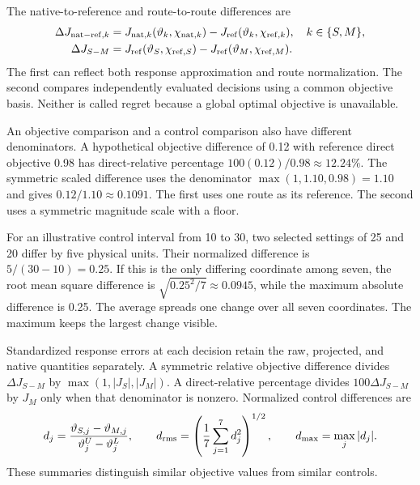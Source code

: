The native-to-reference and route-to-route differences are
\begin{align}
\equationname{Difference between route-native and reference-model objectives}
\Delta J_{{\rm nat-ref},k}&=
J_{{\rm nat},k}(\vartheta_k,\chi_{{\rm nat},k})
-J_{\rm ref}(\vartheta_k,\chi_{{\rm ref},k}),\quad k\in\{S,M\},\\
\equationname{Reference-model objective difference between optimization routes}
\Delta J_{S-M}&=J_{\rm ref}(\vartheta_S,\chi_{{\rm ref},S})
-J_{\rm ref}(\vartheta_M,\chi_{{\rm ref},M}).
\label{eq:plant_objective_comparison}
\end{align}
The first can reflect both response approximation and route normalization. The second compares independently evaluated decisions using a common objective basis. Neither is called regret because a global optimal objective is unavailable.

An objective comparison and a control comparison also have different denominators. A hypothetical objective difference of 0.12 with reference direct objective 0.98 has direct-relative percentage $100(0.12)/0.98\approx12.24\%$. The symmetric scaled difference uses the denominator $\max(1,1.10,0.98)=1.10$ and gives $0.12/1.10\approx0.1091$. The first uses one route as its reference. The second uses a symmetric magnitude scale with a floor.

For an illustrative control interval from 10 to 30, two selected settings of 25 and 20 differ by five physical units. Their normalized difference is $5/(30-10)=0.25$. If this is the only differing coordinate among seven, the root mean square difference is $\sqrt{0.25^2/7}\approx0.0945$, while the maximum absolute difference is 0.25. The average spreads one change over all seven coordinates. The maximum keeps the largest change visible.

Standardized response errors at each decision retain the raw, projected, and native quantities separately. A symmetric relative objective difference divides $\Delta J_{S-M}$ by $\max(1,|J_S|,|J_M|)$. A direct-relative percentage divides $100\Delta J_{S-M}$ by $J_M$ only when that denominator is nonzero. Normalized control differences are
\begin{equation}
\equationname{Normalized operating-control differences and their summaries}
d_j=\frac{\vartheta_{S,j}-\vartheta_{M,j}}{\vartheta_j^U-\vartheta_j^L},\qquad
d_{\rm rms}=\left(\frac17\sum_{j=1}^7d_j^2\right)^{1/2},\qquad
d_{\max}=\max_j|d_j|.
\end{equation}
These summaries distinguish similar objective values from similar controls.

